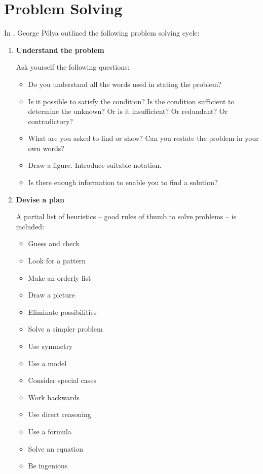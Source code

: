 \section*{Problem Solving}
In \cite{polya}, George P\'{o}lya outlined the following problem solving cycle:
\begin{enumerate}
\item \textbf{Understand the problem}

Ask yourself the following questions:
\begin{itemize}
\item Do you understand all the words used in stating the problem?
\item Is it possible to satisfy the condition? Is the condition sufficient to determine the unknown? Or is it insufficient? Or redundant? Or contradictory?
\item What are you asked to find or show? Can you restate the problem in your own words?
\item Draw a figure. Introduce suitable notation.
\item Is there enough information to enable you to find a solution?
\end{itemize}

\item \textbf{Devise a plan}

A partial list of heuristics -- good rules of thumb to solve problems -- is included:
\begin{multicols}{2}
\begin{itemize}
\item Guess and check
\item Look for a pattern
\item Make an orderly list
\item Draw a picture
\item Eliminate possibilities
\item Solve a simpler problem
\item Use symmetry
\item Use a model
\item Consider special cases
\item Work backwards
\item Use direct reasoning
\item Use a formula
\item Solve an equation
\item Be ingenious
\end{itemize}
\end{multicols}


\end{enumerate}
